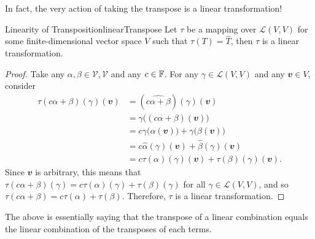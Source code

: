\documentclass[math, code]{amznotes}
\theoremstyle{remark}
\begin{document}
In fact, the very action of taking the transpose is a linear transformation!
\begin{probox}{Linearity of Transposition}{linearTranspose}
    Let $\tau$ be a mapping over $\mathcal{L}(V, V)$ for some finite-dimensional vector space $V$ such that $\tau(T) = \widehat{T}$, then $\tau$ is a linear transformation.
    \tcblower
    \begin{proof}
        Take any $\alpha, \beta \in \mathcal{V, V}$ and any $c \in \mathbb{F}$. For any $\gamma \in \mathcal{L}(V, V)$ and any $\mathbfit{v} \in V$, consider 
        \begin{align*}
            \tau(c\alpha + \beta)(\gamma)(\mathbfit{v}) & = \left(\widehat{c\alpha + \beta}\right)(\gamma)(\mathbfit{v}) \\
            & = \gamma\bigl((c\alpha + \beta)(\mathbfit{v})\bigr) \\
            & = c\gamma\bigl(\alpha(\mathbfit{v})\bigr) + \gamma\bigl(\beta(\mathbfit{v})\bigr) \\
            & = c\widehat{\alpha}(\gamma)(\mathbfit{v}) + \widehat{\beta}(\gamma)(\mathbfit{v}) \\
            & = c\tau(\alpha)(\gamma)(\mathbfit{v}) + \tau(\beta)(\gamma)(\mathbfit{v}).
        \end{align*}
        Since $\mathbfit{v}$ is arbitrary, this means that $\tau(c\alpha + \beta)(\gamma) = c\tau(\alpha)(\gamma) + \tau(\beta)(\gamma)$ for all $\gamma \in \mathcal{L}(V, V)$, and so $\tau(c\alpha + \beta) = c\tau(\alpha) + \tau(\beta)$. Therefore, $\tau$ is a linear transformation.
    \end{proof}
\end{probox}
The above is essentially saying that the transpose of a linear combination equals the linear combination of the transposes of each terms.
\end{document}
